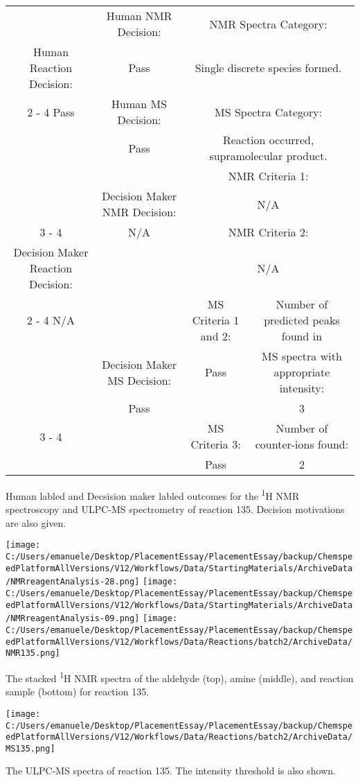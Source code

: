 \documentclass{article}%
\begin{document}
\begin{Decision Table}[H]%
\begin{tabular}{|c|c|c|c|}%
\hline%
&Human NMR Decision:&\multicolumn{2}{|c|}{NMR Spectra Category:}\\%
Human Reaction Decision:&Pass&\multicolumn{2}{|c|}{Single discrete species formed.}\\%
\cline{2%
-%
4}%
Pass&Human MS Decision:&\multicolumn{2}{|c|}{MS Spectra Category:}\\%
&Pass&\multicolumn{2}{|c|}{Reaction occurred, supramolecular product.}\\%
\hline%
&&\multicolumn{2}{|c|}{NMR Criteria 1:}\\%
&Decision Maker NMR Decision:&\multicolumn{2}{|c|}{N/A}\\%
\cline{3%
-%
4}%
&N/A&\multicolumn{2}{|c|}{NMR Criteria 2:}\\%
Decision Maker Reaction Decision:&&\multicolumn{2}{|c|}{N/A}\\%
\cline{2%
-%
4}%
N/A&&MS Criteria 1 and 2:&Number of predicted peaks found in\\%
&Decision Maker MS Decision:&Pass&MS spectra with appropriate intensity:\\%
&Pass&&3\\%
\cline{3%
-%
4}%
&&MS Criteria 3:&Number of counter{-}ions found:\\%
&&Pass&2\\%
\hline%
\end{tabular}%
\caption{Human labled and Decsision maker labled outcomes for the \textsuperscript{1}H NMR spectroscopy and ULPC-MS spectrometry of reaction 135. Decision motivations are also given.}%
\end{Decision Table}%
\begin{NMR Spectra}[H]%
\begin{center}%
\texttt{[image: C:/Users/emanuele/Desktop/PlacementEssay/PlacementEssay/backup/ChemspeedPlatformAllVersions/V12/Workflows/Data/StartingMaterials/ArchiveData/NMRreagentAnalysis-28.png]}\hfill%
\texttt{[image: C:/Users/emanuele/Desktop/PlacementEssay/PlacementEssay/backup/ChemspeedPlatformAllVersions/V12/Workflows/Data/StartingMaterials/ArchiveData/NMRreagentAnalysis-09.png]}\hfill%
\texttt{[image: C:/Users/emanuele/Desktop/PlacementEssay/PlacementEssay/backup/ChemspeedPlatformAllVersions/V12/Workflows/Data/Reactions/batch2/ArchiveData/NMR135.png]}\hfill%
\end{center}%
\caption{The stacked \textsuperscript{1}H NMR spectra of the aldehyde (top), amine (middle), and reaction sample (bottom) for reaction 135.}%
\end{NMR Spectra}%
\begin{MS Spectra}[H]%
\begin{center}%
\texttt{[image: C:/Users/emanuele/Desktop/PlacementEssay/PlacementEssay/backup/ChemspeedPlatformAllVersions/V12/Workflows/Data/Reactions/batch2/ArchiveData/MS135.png]}\hfill%
\end{center}%
\caption{The ULPC-MS spectra of reaction 135. The intensity threshold is also shown.}%
\end{MS Spectra}%
\end{document}
